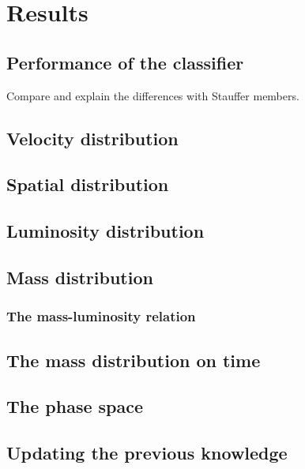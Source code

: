 \chapter{Results}
\label{chap:Results}

\section{Performance of the classifier}
Compare and explain the differences with Stauffer members.
\section{Velocity distribution}
\section{Spatial distribution}
\section{Luminosity distribution}
\section{Mass distribution}
\subsection{The mass-luminosity relation}

\section{The mass distribution on time}

\section{The phase space}

\section{Updating the previous knowledge}
